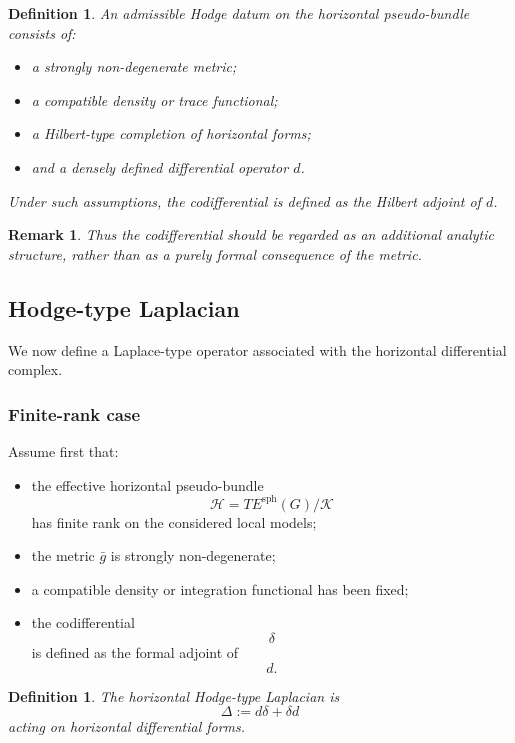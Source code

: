 \documentclass[11pt]{amsart}
\newtheorem{definition}[theorem]{Definition}
\newtheorem{remark}[theorem]{Remark}
\begin{document}
\begin{definition}
An admissible Hodge datum on the horizontal pseudo-bundle consists of:
\begin{itemize}
\item a strongly non-degenerate metric;
\item a compatible density or trace functional;
\item a Hilbert-type completion of horizontal forms;
\item and a densely defined differential operator \(d\).
\end{itemize}

Under such assumptions, the codifferential is defined as the Hilbert adjoint
of \(d\).
\end{definition}

\begin{remark}
Thus the codifferential should be regarded as an additional analytic structure,
rather than as a purely formal consequence of the metric.
\end{remark}
\subsection{Hodge-type Laplacian}

We now define a Laplace-type operator associated with the horizontal
differential complex.

\subsubsection{Finite-rank case}

Assume first that:
\begin{itemize}
\item the effective horizontal pseudo-bundle
\[
\mathcal H
=
TE^{\mathrm{sph}}(G)/\mathcal K
\]
has finite rank on the considered local models;
\item the metric \(\bar g\) is strongly non-degenerate;
\item a compatible density or integration functional has been fixed;
\item the codifferential
\[
\delta
\]
is defined as the formal adjoint of
\[
d.
\]
\end{itemize}

\begin{definition}
The horizontal Hodge-type Laplacian is
\[
\Delta
:=
d\delta+\delta d
\]
acting on horizontal differential forms.
\end{definition}
\end{document}
